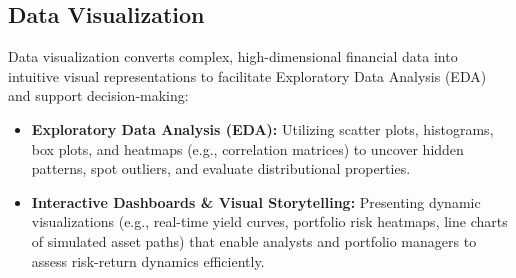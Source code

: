 \subsection{Data Visualization}
Data visualization converts complex, high-dimensional financial data into intuitive visual representations to facilitate Exploratory Data Analysis (EDA) and support decision-making:
\begin{itemize}[noitemsep, topsep=2pt, parsep=0pt]
	\item \textbf{Exploratory Data Analysis (EDA):} Utilizing scatter plots, histograms, box plots, and heatmaps (e.g., correlation matrices) to uncover hidden patterns, spot outliers, and evaluate distributional properties.
	\item \textbf{Interactive Dashboards \& Visual Storytelling:} Presenting dynamic visualizations (e.g., real-time yield curves, portfolio risk heatmaps, line charts of simulated asset paths) that enable analysts and portfolio managers to assess risk-return dynamics efficiently.
\end{itemize}
